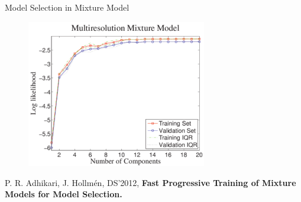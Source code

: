 \documentclass[first=dgreen,second=purple,logo=redexc]{aaltoslides}
\newcommand\FrameText[1]{%
  \begin{textblock*}{0.98\textwidth}(0.2\textwidth,0.95\textheight)
    \textcolor {blue}{\scriptsize\raggedright #1\hspace{0.1\textwidth}}
  \end{textblock*}}
\begin{document}


\begin{frame} {Model Selection in Mixture Model} 

      \begin{figure}
      \centering
      \includegraphics[trim=0cm 0cm 0cm 0cm, clip=true, width=0.7\textwidth]{figures/mdlselectmultiple}
      \end{figure}
    {\footnotesize  P. R. Adhikari, J. Hollm{\'e}n, DS'2012, \textbf{Fast Progressive Training of Mixture Models for Model Selection.}}
      
      


\end{frame}

\end{document}

